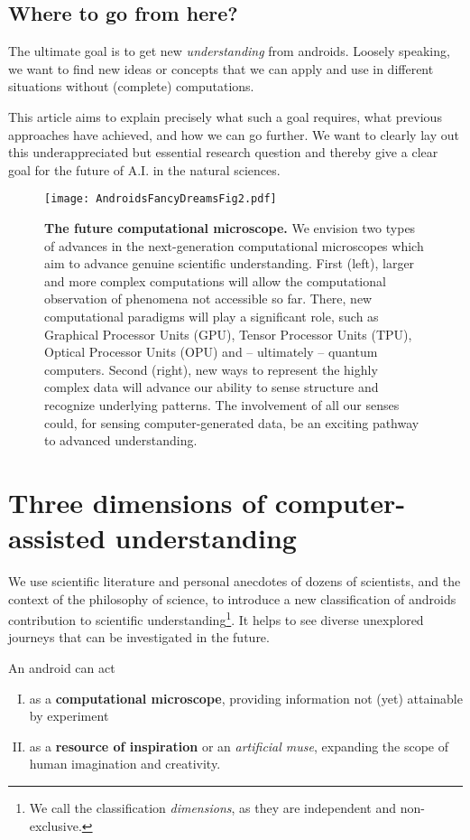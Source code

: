 \subsection{Where to go from here?}
The ultimate goal is to get new \textit{understanding} from androids. Loosely speaking, we want to find new ideas or concepts that we can apply and use in different situations without (complete) computations.

This article aims to explain precisely what such a goal requires, what previous approaches have achieved, and how we can go further. We want to clearly lay out this underappreciated but essential research question and thereby give a clear goal for the future of A.I. in the natural sciences.


\begin{figure*}[ht]
\centering
\texttt{[image: AndroidsFancyDreamsFig2.pdf]}
\caption{\textbf{The future computational microscope.} We envision two types of advances in the next-generation computational microscopes which aim to advance genuine scientific understanding. First (left), larger and more complex computations will allow the computational observation of phenomena not accessible so far. There, new computational paradigms will play a significant role, such as Graphical Processor Units (GPU), Tensor Processor Units (TPU), Optical Processor Units (OPU) and -- ultimately -- quantum computers. Second (right), new ways to represent the highly complex data will advance our ability to sense structure and recognize underlying patterns. The involvement of all our senses could, for sensing computer-generated data, be an exciting pathway to advanced understanding.}
\label{fig:flowofargument2}
\end{figure*}



\section{Three dimensions of computer-assisted understanding}\label{sec:III}
We use scientific literature and personal anecdotes of dozens of scientists, and the context of the philosophy of science, to introduce a new classification of androids contribution to scientific understanding\footnote{We call the classification \textit{dimensions}, as they are independent and non-exclusive.}. It helps to see diverse unexplored journeys that can be investigated in the future.

An android can act
\begin{enumerate}[I)]
\item as a \textbf{computational microscope}, providing information not (yet) attainable by experiment

\item as a \textbf{resource of inspiration} or an \textit{artificial muse}, expanding the scope of human imagination and creativity.
\end{enumerate}

